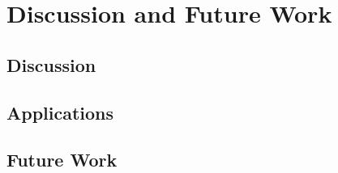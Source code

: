 \section{Discussion and Future Work}
\subsection{Discussion}
\subsection{Applications}
\subsection{Future Work}
